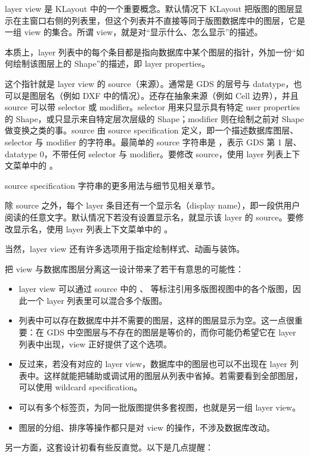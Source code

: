 layer view 是 KLayout 中的一个重要概念。默认情况下 KLayout 把版图的图层显示在主窗口右侧的列表里，但这个列表并不直接等同于版图数据库中的图层，它是一组 view 的集合。所谓 view，就是对“显示什么、怎么显示”的描述。

本质上，layer 列表中的每个条目都是指向数据库中某个图层的指针，外加一份“如何绘制该图层上的 Shape”的描述，即 layer properties。

这个指针就是 layer view 的 source（来源）。通常是 GDS 的层号与 datatype，也可以是图层名（例如 DXF 中的情况）。还存在抽象来源（例如 Cell 边界），并且 source 可以带 selector 或 modifier。selector 用来只显示具有特定 user properties 的 Shape，或只显示来自特定层次层级的 Shape；modifier 则在绘制之前对 Shape 做变换之类的事。source 由 source specification 定义，即一个描述数据库图层、selector 与 modifier 的字符串。最简单的 source 字符串是 ，表示 GDS 第 1 层、datatype 0，不带任何 selector 与 modifier。要修改 source，使用 layer 列表上下文菜单中的 。

source specification 字符串的更多用法与细节见相关章节。

除 source 之外，每个 layer 条目还有一个显示名（display name），即一段供用户阅读的任意文字。默认情况下若没有设置显示名，就显示该 layer 的 source。要修改显示名，使用 layer 列表上下文菜单中的 。

当然，layer view 还有许多选项用于指定绘制样式、动画与装饰。

把 view 与数据库图层分离这一设计带来了若干有意思的可能性：

\begin{itemize}
\item layer view 可以通过 source 中的 、 等标注引用多版图视图中的各个版图，因此一个 layer 列表里可以混合多个版图。
\item 列表中可以存在数据库中并不需要的图层，这样的图层显示为空。这一点很重要：在 GDS 中空图层与不存在的图层是等价的，而你可能仍希望它在 layer 列表中出现，view 正好提供了这个选项。
\item 反过来，若没有对应的 layer view，数据库中的图层也可以不出现在 layer 列表中。这样就能把辅助或调试用的图层从列表中省掉。若需要看到全部图层，可以使用 wildcard specification。
\item 可以有多个标签页，为同一批版图提供多套视图，也就是另一组 layer view。
\item 图层的分组、排序等操作都只是对 view 的操作，不涉及数据库改动。
\end{itemize}

另一方面，这套设计初看有些反直觉。以下是几点提醒：

